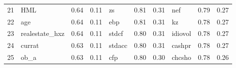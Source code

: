\documentclass[12pt]{article}
\begin{document}
\begin{landscape}
\begin{footnotesize}
\begin{longtable}{l|lcc|lcc|lcc}
			21                    & HML                         & 0.64                                                                                 & 0.11                            & zs                          & 0.81                                                                                 & 0.31                            & nef                         & 0.79                                                                                 & 0.27                           \\
			22                    & age                         & 0.64                                                                                 & 0.11                            & ebp                         & 0.81                                                                                 & 0.31                            & kz                          & 0.78                                                                                 & 0.27                           \\
			23                    & realestate\_hxz             & 0.64                                                                                 & 0.11                            & stdcf                       & 0.80                                                                                 & 0.31                            & idiovol                     & 0.78                                                                                 & 0.27                           \\
			24                    & currat                      & 0.63                                                                                 & 0.11                            & stdacc                      & 0.80                                                                                 & 0.31                            & cashpr                      & 0.78                                                                                 & 0.27                           \\
			25                    & ob\_a                       & 0.63                                                                                 & 0.11                            & cfp                         & 0.80                                                                                 & 0.30                            & chcsho                      & 0.78                                                                                 & 0.26                           \\

\end{longtable}
\end{footnotesize}
\end{landscape}
\end{document}
